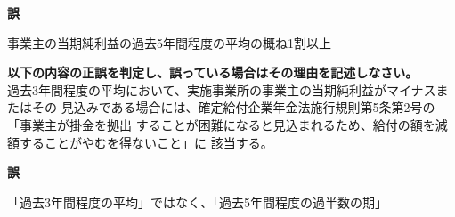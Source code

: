 \begin{answerbox}
  \textbf{誤}

  事業主の当期純利益の過去5年間程度の平均の概ね1割以上
\end{answerbox}

\begin{truefalse}[年金1 \ 2018 \ 問題2(1)\textcircled{3}]
  \textbf{以下の内容の正誤を判定し、誤っている場合はその理由を記述しなさい。}
  \\

  過去3年間程度の平均において、実施事業所の事業主の当期純利益がマイナスまたはその
見込みである場合には、確定給付企業年金法施行規則第5条第2号の「事業主が掛金を拠出
することが困難になると見込まれるため、給付の額を減額することがやむを得ないこと」に
該当する。
\end{truefalse}

\begin{answerbox}
  \textbf{誤}

  「過去3年間程度の平均」ではなく、「過去5年間程度の過半数の期」
\end{answerbox}

